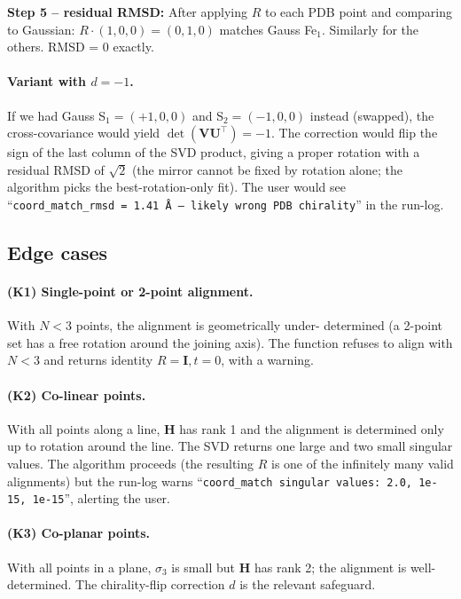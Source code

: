 \documentclass[10pt,a4paper,twoside]{article}
\newcommand{\Hmat}{\mathbf{H}}
\newcommand{\Umat}{\mathbf{U}}
\newcommand{\Vmat}{\mathbf{V}}
\begin{document}
\textbf{Step 5 -- residual RMSD:}
After applying $R$ to each PDB point and comparing to Gaussian:
$R \cdot (1,0,0) = (0,1,0)$ \checkmark matches Gauss Fe$_1$. Similarly
for the others. RMSD = 0 exactly.

\paragraph{Variant with $d = -1$.}
If we had Gauss S$_1 = (+1, 0, 0)$ and S$_2 = (-1, 0, 0)$ instead
(swapped), the cross-covariance would yield $\det(\Vmat\Umat^\top)
= -1$. The correction would flip the sign of the last column of
the SVD product, giving a proper rotation with a residual RMSD of
$\sqrt{2}$ (the mirror cannot be fixed by rotation alone; the
algorithm picks the best-rotation-only fit). The user would see
``\texttt{coord\_match\_rmsd = 1.41 \AA{} -- likely wrong PDB
chirality}'' in the run-log.

\subsection{Edge cases}

\paragraph{(K1) Single-point or 2-point alignment.}
With $N < 3$ points, the alignment is geometrically under-
determined (a 2-point set has a free rotation around the
joining axis). The function refuses to align with $N < 3$ and
returns identity $R = \mathbf{I}, t = 0$, with a warning.

\paragraph{(K2) Co-linear points.}
With all points along a line, $\Hmat$ has rank 1 and the
alignment is determined only up to rotation around the line. The
SVD returns one large and two small singular values. The
algorithm proceeds (the resulting $R$ is one of the infinitely
many valid alignments) but the run-log warns
``\texttt{coord\_match singular values: 2.0, 1e-15, 1e-15}'',
alerting the user.

\paragraph{(K3) Co-planar points.}
With all points in a plane, $\sigma_3$ is small but $\Hmat$ has
rank 2; the alignment is well-determined. The chirality-flip
correction $d$ is the relevant safeguard.
\end{document}
